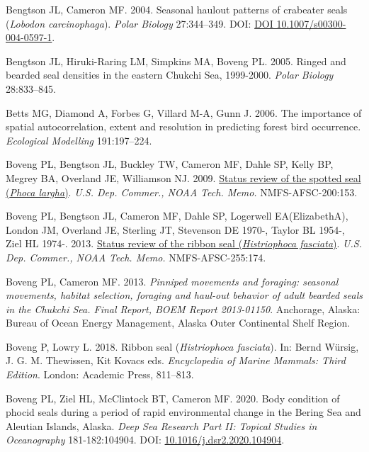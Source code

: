 \documentclass[fleqn,10pt,lineno]{wlpeerj} %
\newlength{\cslhangindent}
\newenvironment{CSLReferences}[2] %
 {\begin{list}{}{%
  \setlength{\itemindent}{0pt}
  \setlength{\leftmargin}{0pt}
  \setlength{\parsep}{0pt}
  \ifodd #1
   \setlength{\leftmargin}{\cslhangindent}
   \setlength{\itemindent}{-1\cslhangindent}
  \fi
  \setlength{\itemsep}{#2\baselineskip}}}
 {\end{list}}
\begin{document}
\label{refs}
\begin{CSLReferences}{1}{0}
Bengtson JL, Cameron MF. 2004. Seasonal haulout patterns of crabeater seals (\emph{Lobodon carcinophaga}). \emph{Polar Biology} 27:344--349. DOI: \href{https://doi.org/DOI\%2010.1007/s00300-004-0597-1}{DOI 10.1007/s00300-004-0597-1}.

Bengtson JL, Hiruki-Raring LM, Simpkins MA, Boveng PL. 2005. Ringed and bearded seal densities in the eastern Chukchi Sea, 1999-2000. \emph{Polar Biology} 28:833--845.

Betts MG, Diamond A, Forbes G, Villard M-A, Gunn J. 2006. The importance of spatial autocorrelation, extent and resolution in predicting forest bird occurrence. \emph{Ecological Modelling} 191:197--224.

Boveng PL, Bengtson JL, Buckley TW, Cameron MF, Dahle SP, Kelly BP, Megrey BA, Overland JE, Williamson NJ. 2009. \href{https://repository.library.noaa.gov/view/noaa/3671}{Status review of the spotted seal (\emph{Phoca largha})}. \emph{U.S. Dep. Commer., NOAA Tech. Memo.} NMFS-AFSC-200:153.

Boveng PL, Bengtson JL, Cameron MF, Dahle SP, Logerwell EA(ElizabethA), London JM, Overland JE, Sterling JT, Stevenson DE 1970-, Taylor BL 1954-, Ziel HL 1974-. 2013. \href{https://repository.library.noaa.gov/view/noaa/4451}{Status review of the ribbon seal (\emph{Histriophoca fasciata})}. \emph{U.S. Dep. Commer., NOAA Tech. Memo.} NMFS-AFSC-255:174.

Boveng PL, Cameron MF. 2013. \emph{Pinniped movements and foraging: seasonal movements, habitat selection, foraging and haul-out behavior of adult bearded seals in the Chukchi Sea. Final Report, BOEM Report 2013-01150}. Anchorage, Alaska: Bureau of Ocean Energy Management, Alaska Outer Continental Shelf Region.

Boveng P, Lowry L. 2018. Ribbon seal (\emph{Histriophoca fasciata}). In: Bernd Würsig, J. G. M. Thewissen, Kit Kovacs eds. \emph{Encyclopedia of Marine Mammals: Third Edition}. London: Academic Press, 811--813.

Boveng PL, Ziel HL, McClintock BT, Cameron MF. 2020. Body condition of phocid seals during a period of rapid environmental change in the Bering Sea and Aleutian Islands, Alaska. \emph{Deep Sea Research Part II: Topical Studies in Oceanography} 181-182:104904. DOI: \href{https://doi.org/10.1016/j.dsr2.2020.104904}{10.1016/j.dsr2.2020.104904}.


\end{CSLReferences}
\end{document}
